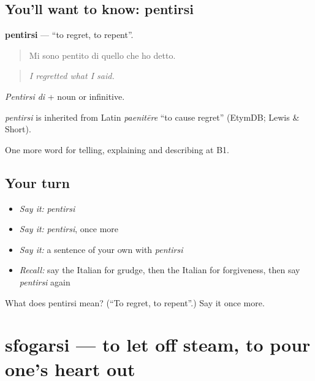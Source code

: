 \subsection*{You'll want to know: pentirsi}
\textbf{pentirsi} — \textquotedblleft{}to regret, to repent\textquotedblright{}.

\begin{quote}
Mi sono pentito di quello che ho detto.
\end{quote}

\begin{quote}
\emph{I regretted what I said.}
\end{quote}

\emph{Pentirsi di} + noun or infinitive.

\begin{cousinweb}
\emph{pentirsi} is inherited from Latin \emph{paenitēre} \textquotedblleft{}to cause regret\textquotedblright{} (EtymDB; Lewis \& Short).
\end{cousinweb}

\begin{grammarlens}[title={What you've built}]
One more word for telling, explaining and describing at B1.
\end{grammarlens}

\subsection*{Your turn}
\begin{itemize}
\raggedright
  \item \emph{Say it:} \emph{pentirsi}
  \item \emph{Say it:} \emph{pentirsi}, once more
  \item \emph{Say it:} a sentence of your own with \emph{pentirsi}
  \item \emph{Recall:} say the Italian for grudge, then the Italian for forgiveness, then say \emph{pentirsi} again
\end{itemize}

\begin{tcolorbox}[breakable,colback=teal!4,colframe=teal!35!black,title={Before you move on}]
What does pentirsi mean? (\textquotedblleft{}To regret, to repent\textquotedblright{}.) Say it once more.
\end{tcolorbox}
\section[sfogarsi]{sfogarsi — to let off steam, to pour one's heart out}

